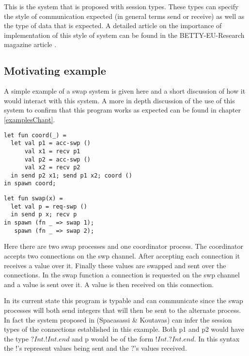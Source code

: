 This is the system that is proposed with session types. These types can specify the style of communication expected (in general terms send or receive) as well as the type of data that is expected. A detailed article on the importance of implementation of this style of system can be found in the BETTY-EU-Research magazine article \cite{ariticle}.

\subsection{Motivating example}
\label{introExample}

A simple example of a swap system is given here and a short discussion of how it would interact with this system. A more in depth discussion of the use of this system to confirm that this program works as expected can be found in chapter \ref{examplesChapt}. 

\begin{minipage}{.45\textwidth}
\begin{lstlisting}[backgroundcolor=\color{white},numbers=none]
let fun coord(_) =
  let val p1 = acc-swp ()
      val x1 = recv p1
      val p2 = acc-swp ()
      val x2 = recv p2
  in send p2 x1; send p1 x2; coord ()
in spawn coord;
\end{lstlisting}
\end{minipage}
\hfill
\begin{minipage}{.45\textwidth}
\begin{lstlisting}[backgroundcolor=\color{white},numbers=none]
let fun swap(x) =
  let val p = req-swp ()
  in send p x; recv p
in spawn (fn _ => swap 1);
   spawn (fn _ => swap 2);
\end{lstlisting}
\vspace{2em}
\end{minipage}

Here there are two swap processes and one coordinator process. The coordinator accepts two connections on the swp channel. After accepting each connection it receives a value over it. Finally these values are swapped and sent over the connections. In the swap function a connection is requested on the swp channel and a value is sent over it. A value is then received on this connection. 

In its current state this program is typable and can communicate since the swap processes will both send integers that will then be sent to the alternate process. In fact the system proposed in (Spacasassi \& Koutavas) \cite{paper1} can infer the session types of the connections established in this example. Both p1 and p2 would have the type $?Int.!Int.end$ and p would be of the form $!Int.?Int.end$. In this syntax the $!$'s represent values being sent and the $?$'s values received. 

